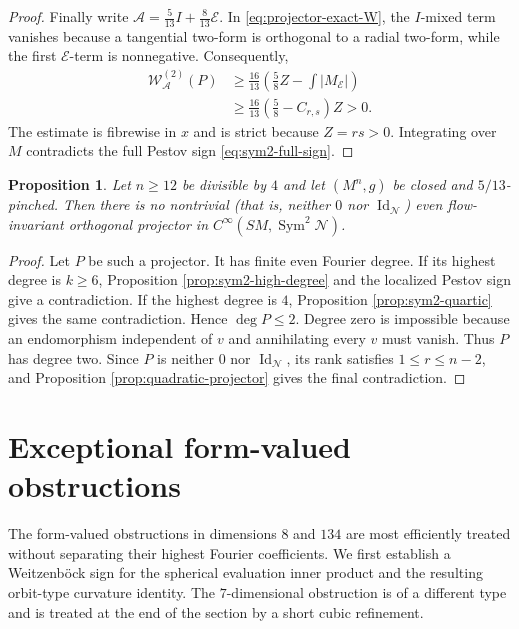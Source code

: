 \documentclass[reqno,11pt]{amsart}
\newtheorem{proposition}[theorem]{Proposition}
\theoremstyle{definition}
\newcommand{\SM}{SM}
\newcommand{\cN}{\mathcal N}
\newcommand{\cA}{\mathcal A}
\newcommand{\cE}{\mathcal E}
\newcommand{\Sym}{\operatorname{Sym}}
\newcommand{\Id}{\operatorname{Id}}
\begin{document}
\begin{proof}
Finally write $\cA=\frac5{13}I+\frac8{13}\cE$.  In
\eqref{eq:projector-exact-W}, the $I$-mixed term vanishes because a
tangential two-form is orthogonal to a radial two-form, while the first
$\cE$-term is nonnegative.  Consequently,
\begin{align*}
 \mathscr W^{(2)}_{\cA}(P)
 &\geq\frac{16}{13}
 \left(\frac58Z-\int|M_{\cE}|\right)\\
 &\geq\frac{16}{13}\left(\frac58-C_{r,s}\right)Z>0.
\end{align*}
The estimate is fibrewise in $x$ and is strict because $Z=rs>0$.
Integrating over $M$ contradicts the full Pestov sign
\eqref{eq:sym2-full-sign}.
\end{proof}

\begin{proposition}
\label{prop:symmetric-projector-vanishing}
Let $n\geq12$ be divisible by $4$ and let $(M^n,g)$ be closed and
$5/13$-pinched. Then there is no nontrivial (that is, neither $0$ nor
$\Id_{\cN}$) even flow-invariant orthogonal projector in
$C^\infty(\SM,\Sym^2\cN)$.
\end{proposition}

\begin{proof}
Let $P$ be such a projector. It has finite even Fourier degree. If its
highest degree is $k\geq6$, Proposition \ref{prop:sym2-high-degree} and the
localized Pestov sign give a contradiction. If the highest degree is $4$,
Proposition \ref{prop:sym2-quartic} gives the same contradiction. Hence
$\deg P\leq2$. Degree zero is impossible because an endomorphism independent
of $v$ and annihilating every $v$ must vanish. Thus $P$ has degree two. Since
$P$ is neither $0$ nor $\Id_{\cN}$, its rank satisfies $1\leq r\leq n-2$,
and Proposition \ref{prop:quadratic-projector} gives the final contradiction.
\end{proof}

\section{Exceptional form-valued obstructions}\label{sec:exceptional-dimensions}

The form-valued obstructions in dimensions $8$ and $134$ are most
efficiently treated without separating their highest Fourier coefficients.
We first establish a Weitzenb\"ock sign for the spherical evaluation inner
product and the resulting orbit-type curvature identity.  The $7$-dimensional obstruction is of a
different type and is treated at the end of the section by a short cubic
refinement.
\end{document}
